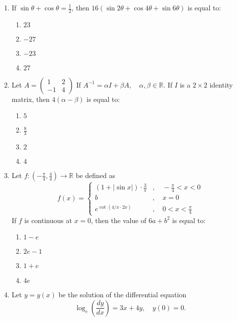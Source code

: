 \documentclass[journal]{IEEEtran}
\numberwithin{equation}{enumi}
\numberwithin{figure}{enumi}
\begin{document}
\begin{enumerate}
\item If $\sin\theta+\cos\theta=\frac{1}{2}$, then $16(\sin2\theta+\cos4\theta+\sin6\theta)$ is equal to:
\begin{enumerate}
    \item $23$
    \item $-27$
    \item $-23$
    \item $27$
\end{enumerate}
  \item Let $A=\begin{pmatrix}
      1 & 2\\
      -1 & 4
  \end{pmatrix}$
      If $ A^{-1} = \alpha I + \beta A, \quad \alpha, \beta \in \mathbb{R} $. If $ I $ is a $ 2 \times 2 $ identity matrix, then $ 4(\alpha - \beta) $ is equal to:
    \begin{enumerate}
        \item $ 5 $
        \item $ \frac{8}{3} $
        \item $ 2 $
        \item $ 4 $
    \end{enumerate}
\item Let $ f: \left(-\frac{\pi}{4}, \frac{4}{4}\right) \to \mathbb{R} $ be defined as
\begin{equation}
       f(x) =
    \begin{cases}
        (1 + |\sin x|) \cdot \frac{3}{\pi} & , \quad -\frac{\pi}{4} < x < 0 \\
        b & , \quad x = 0 \\
        e^{\cot(4/x \cdot 2x)} & , \quad 0 < x < \frac{\pi}{4}
    \end{cases}
  \end{equation}
    If $ f $ is continuous at $ x = 0 $, then the value of $ 6a + b^2 $ is equal to:
    \begin{enumerate}
        \item $ 1 - e $
        \item $ 2e - 1 $
        \item $ 1 + e $
        \item $ 4e $
    \end{enumerate}
 \item Let $y = y(x)$ be the solution of the differential equation 
    \begin{equation}
    \log_e\left(\frac{dy}{dx}\right) = 3x + 4y, \quad y(0) = 0.
    \end{equation}

\end{enumerate}
\end{document}
